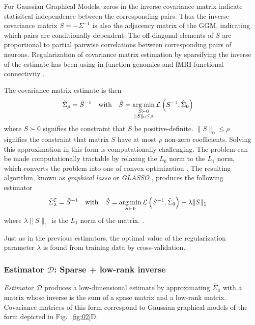 For Gaussian Graphical Models, zeros in the inverse covariance matrix indicate statisitcal independence between the corresponding pairs. Thus the inverse covariance matrix $S=-\Sigma^{-1}$ is also the adjacency matrix of the GGM, indicating which pairs are conditionally dependent.   The off-diagonal elements of $S$ are proportional to partial pairwise correlations between corresponding pairs of neurons.  Regularization of covariance matrix estimation by sparsifying the inverse of the estimate has been using in function genomics \cite{Schafer:2005,other} and fMRI functional connectivity \cite{Varoquaux:2012}. 

The covariance matrix estimate is then 
\begin{equation}
\hat\Sigma_\rho = \hat S^{-1}
\quad\mbox{with}\quad
\hat S = \operatorname*{arg\,min}\limits_{\substack{S\succ 0 \\ \|S\|_0 \le \rho}} \mathcal L\left(S^{-1},\hat\Sigma_0\right)   
\end{equation}
where $S\succ 0$ signifies the constraint that $S$ be positive-definite. $\|S\|_0\le\rho$ signifies the constraint  that matrix $S$ have at most $\rho$ non-zero coefficients.
Solving this approximation in this form is computationally challenging. The problem can be made computationally tractable by relaxing  the $L_0$ norm to the $L_1$ norm, which converts the problem into one of convex optimization \cite{Donoho:2000}.  The resulting algorithm, known as \emph{graphical lasso} or \emph{GLASSO}  \cite{Meinshausen:2006,Yuan:2007,Banerjee:2008,Friedman:2008}, produces the following estimator  
\begin{equation}
\hat\Sigma_\lambda^\mathcal{C} = \hat S^{-1}
\quad\mbox{with}\quad
\hat S = \operatorname*{arg\,min}\limits_{S\succ 0} \mathcal L\left(S^{-1},\hat\Sigma_0\right) + \lambda \|S\|_1
\end{equation}
where $\lambda \|S\|_1$ is the $L_1$ norm of the matrix. .

Just as in the previous estimators, the optimal value of the regularization parameter $\lambda$ is found from training data by cross-validation.

\subsubsection*{Estimator $\mathcal D$: Sparse + low-rank inverse}
\emph{Estimator $\mathcal D$} produces a low-dimensional estimate by approximating $\hat\Sigma_0$ with a matrix whose inverse is the sum of a spase matrix and a low-rank matrix. Covariance matrices of this form correspond to Gaussian graphical models of the form depicted in Fig.~\ref{fig:02}D.

